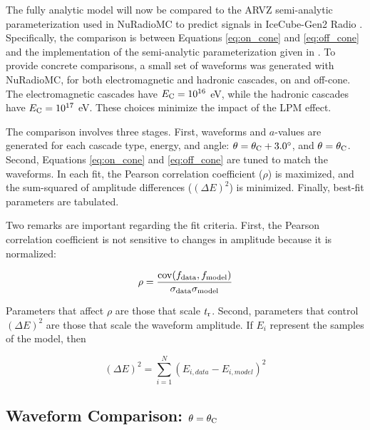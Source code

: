 \documentclass[amsmath,amssymb,aps,prd,10pt,twocolumn]{revtex4}
\DeclareMathOperator\cov{cov}
\begin{document}
The fully analytic model will now be compared to the ARVZ semi-analytic parameterization used in NuRadioMC to predict signals in IceCube-Gen2 Radio \cite{10.1140/epjc/s10052-020-7612-8}.  Specifically, the comparison is between Equations \ref{eq:on_cone} and \ref{eq:off_cone} and the implementation of the semi-analytic parameterization given in \cite{PhysRevD.101.083005}.  To provide concrete comparisons, a small set of waveforms was generated with NuRadioMC, for both electromagnetic and hadronic cascades, on and off-cone.  The electromagnetic cascades have $E_{\rm C} = 10^{16}$ eV, while the hadronic cascades have $E_{\rm C} = 10^{17}$ eV.  These choices minimize the impact of the LPM effect.

The comparison involves three stages.  First, waveforms and $a$-values are generated for each cascade type, energy, and angle: $\theta = \theta_{\rm C} + 3.0^{\circ}$, and $\theta = \theta_{\rm C}$.  Second, Equations \ref{eq:on_cone} and \ref{eq:off_cone} are tuned to match the waveforms.  In each fit, the Pearson correlation coefficient ($\rho$) is maximized, and the sum-squared of amplitude differences ($(\Delta E)^2$) is minimized.  Finally, best-fit parameters are tabulated. 

Two remarks are important regarding the fit criteria.  First, the Pearson correlation coefficient is not sensitive to changes in amplitude because it is normalized:

\begin{equation}
\rho = \frac{\cov(f_{\rm data},f_{\rm model})}{\sigma_{\rm data} \sigma_{\rm model}}
\end{equation}

Parameters that affect $\rho$ are those that scale $t_{\rm r}$.  Second, parameters that control $(\Delta E)^2$ are those that scale the waveform amplitude.  If $E_i$ represent the samples of the model, then

\begin{equation}
(\Delta E)^2 = \sum_{i = 1}^{N} (E_{i,data} - E_{i,model})^2
\end{equation}

\subsection{Waveform Comparison: $\theta = \theta_{\rm C}$}
\label{sec:fit:on}
\end{document}

